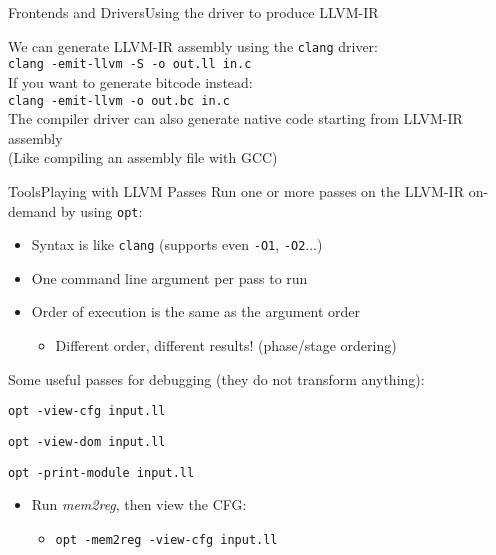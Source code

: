 \begin{frame}{Frontends and Drivers}{Using the driver to produce LLVM-IR}
\begin{center}
\vfill
We can generate LLVM-IR assembly using the \texttt{clang} driver:\\
\bigskip
\texttt{clang -emit-llvm -S -o out.ll in.c}\\
\medskip
{\footnotesize If you want to generate bitcode instead:\\
\texttt{clang -emit-llvm -o out.bc in.c}\\
}
\bigskip
The compiler driver can also generate native code starting from 
LLVM-IR assembly\\
\smallskip
{\small(Like compiling an assembly file with GCC)}
\vfill
\end{center}
\end{frame}


\begin{frame}{Tools}{Playing with LLVM Passes}
Run one or more passes on the LLVM-IR on-demand by using \texttt{opt}:

\begin{itemize}
\item Syntax is like \texttt{clang} (supports even \texttt{-O1}, \texttt{-O2}...)
\item One command line argument per pass to run
\item Order of execution is the same as the argument order
\begin{itemize}
\item Different order, different results! (\alert{phase/stage ordering})
\end{itemize}
\end{itemize}

\vfill
Some useful passes for debugging (they do not transform anything):

{\small
\begin{description}
\item[print CFG] \texttt{opt -view-cfg input.ll}
\item[print dominator tree] \texttt{opt -view-dom input.ll}
\item[print current IR] \texttt{opt -print-module input.ll}
\end{description}
}

\vfill
\begin{example}
\begin{itemize}
\item Run \emph{mem2reg}, then view the CFG:
\begin{itemize}
\item \texttt{opt -mem2reg -view-cfg input.ll}
\end{itemize}
\end{itemize}
\end{example}
\end{frame}


